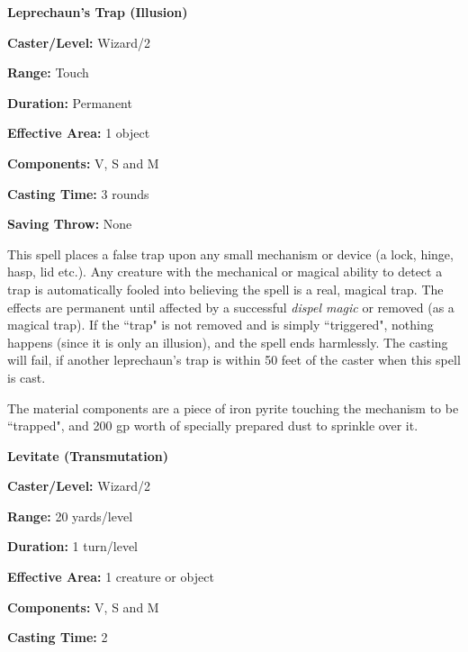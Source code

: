\begin{multicols}{2}
\vspace{1em}

\noindent
\begin{minipage}{\columnwidth}

\noindent \textbf{Leprechaun's Trap (Illusion)}

\noindent \textbf{Caster/Level:} Wizard/2

\noindent \textbf{Range:} Touch

\noindent \textbf{Duration:} Permanent

\noindent \textbf{Effective Area:} 1 object

\noindent \textbf{Components:} V, S and M

\noindent \textbf{Casting Time:} 3 rounds

\noindent \textbf{Saving Throw:} None

\end{minipage}

This spell places a false trap upon any small mechanism or device (a lock, hinge, hasp, lid etc.).  Any creature with the mechanical or magical ability to detect a trap is automatically fooled into believing the spell is a real, magical trap.  The effects are permanent until affected by a successful \textit{dispel magic} or removed (as a magical trap).  If the ``trap" is not removed and is simply ``triggered", nothing happens (since it is only an illusion), and the spell ends harmlessly.  The casting will fail, if another leprechaun's trap is within 50 feet of the caster when this spell is cast.  

The material components are a piece of iron pyrite touching the mechanism to be ``trapped", and 200 gp worth of specially prepared dust to sprinkle over it.

\vspace{1em}

\noindent
\begin{minipage}{\columnwidth}

\noindent \textbf{Levitate (Transmutation)}

\noindent \textbf{Caster/Level:} Wizard/2

\noindent \textbf{Range:} 20 yards/level

\noindent \textbf{Duration:} 1 turn/level

\noindent \textbf{Effective Area:} 1 creature or object

\noindent \textbf{Components:} V, S and M

\noindent \textbf{Casting Time:} 2


\end{minipage}
\end{multicols}
